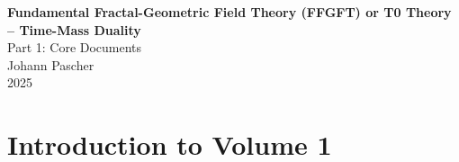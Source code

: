 



	
	\setcounter{section}{0}
	\setcounter{subsection}{0}
	\setcounter{subsubsection}{0}
	\setcounter{paragraph}{0}
	
	\setcounter{secnumdepth}{1}  %
	\makeatletter
	\renewcommand*\l@part[2]{%
		\ifnum \c@tocdepth >-2\relax
		\addpenalty{-\@highpenalty}%
		\addvspace{0.8em \@plus\p@}%
		{\leftskip 0em \relax
			\rightskip \@tocrmarg
			\parfillskip -\rightskip
			\parindent 0em \relax\@afterindenttrue
			\interlinepenalty\@M
			\leavevmode
			{\footnotesize\bfseries #1}\nobreak
			\leaders\hbox{$\m@th\mkern \@dotsep mu\hbox{}\mkern \@dotsep mu$}\hfill
			\nobreak\hb@xt@\@pnumwidth{\hss #2}\par}%
		\addvspace{0.2em \@plus\p@}%
		\nobreak
		\fi}
	\makeatother
	
	\renewcommand{\cftchapfont}{\footnotesize\bfseries}
	\renewcommand{\cftchappagefont}{\footnotesize\bfseries}
	\setlength{\cftbeforechapskip}{0.3em}
	
	\setcounter{tocdepth}{0}
	\begin{titlepage}
		\centering
		\vspace*{2cm}
		
    {\Huge\textbf{Fundamental Fractal-Geometric Field Theory (FFGFT) or T0 Theory – Time-Mass Duality}}\\[1cm]
    {\Large Part 1: Core Documents}\\[2cm]
		
		
		{\large Johann Pascher}\\[1cm]
		
		{\large 2025}
		
		\vfill
	\end{titlepage}
	
	\frontmatter
	\pagestyle{fancy}
	\makeatletter
	\let\ps@plain\ps@fancy
	\let\ps@empty\ps@fancy
	\makeatother
	
	\mainmatter
	\pagestyle{fancy}
	
	\tableofcontents
	
\chapter{Introduction to Volume 1}




